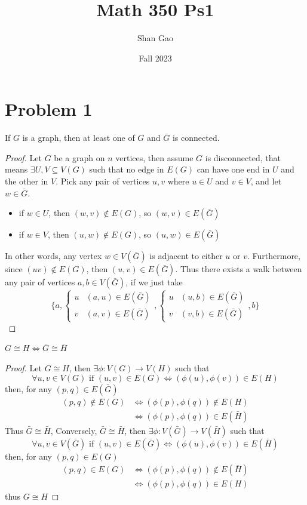 \documentclass[12pt]{article}
\title{Math 350 Ps1}
\author{Shan Gao}
\date{Fall 2023}
\begin{document}
\maketitle
\section{Problem 1}
\begin{lemma}\label{lem:1}
	If $G$ is a graph, then at least one of $G$ and $\bar{G}$ is connected.
\end{lemma}
\begin{proof}
	Let $G$ be a graph on $n$ vertices, then assume $G$ is disconnected, that means $\exists U,V \subseteq V(G)$ such that no edge in $E(G)$ can have one end in $U$ and the other in $V$. Pick any pair of vertices $u,v$ where $u \in U$ and $v \in V$, and let $w \in \bar{G}$. 
	\begin{itemize}
		\item if $w \in U$, then $(w,v) \notin E(G)$, so $(w,v) \in E(\bar{G})$
		\item if $w \in V$, then $(u,w) \notin E(G)$, so $(u,w) \in E(\bar{G})$
	\end{itemize}
	In other words, any vertex $w \in V(\bar{G})$ is adjacent to either $u$ or $v$. Furthermore, since $(uv) \notin E(G)$, then $(u,v) \in E(\bar{G})$. Thus there exists a walk between any pair of vertices $a,b \in V(\bar{G})$, if we just take 
	\begin{equation*}
		\{a , \begin{cases}
				u & (a,u) \in E(\bar{G})\\
				v & (a,v) \in E(\bar{G})
		\end{cases}, \begin{cases}
				u & (u,b) \in E(\bar{G})\\
				v & (v,b) \in E(\bar{G})
		\end{cases}, b\}
	\end{equation*}

\end{proof}
\begin{lemma} \label{lem:2}
	$G \cong H \iff \bar{G} \cong \bar{H}$
\end{lemma}
\begin{proof}
	Let $G \cong H$, then $\exists \phi \colon V(G) \to V(H)$ such that 
	\[ \forall u,v \in V(G) \text{ if }  (u,v) \in E(G) \iff (\phi(u), \phi(v)) \in E(H) \]
	then, for any $(p,q) \in E(\bar{G})$
	\begin{align*}
		(p,q) \notin E(G) &\iff (\phi(p), \phi(q)) \notin E(H)\\
				  &\iff (\phi(p), \phi(q)) \in E(\bar{H})
	\end{align*}
	Thus $\bar{G} \cong \bar{H}$,
	Conversely, $\bar{G} \cong \bar{H}$, then $\exists \phi \colon V(\bar{G}) \to V(\bar{H})$ such that
	\[ \forall u,v \in V(\bar{G}) \text{ if }  (u,v) \in E(\bar{G}) \iff (\phi(u), \phi(v)) \in E(\bar{H}) \]
	then, for any $(p,q) \in E(G)$
	\begin{align*}
		(p,q) \in E(G) &\iff (\phi(p), \phi(q)) \notin E(\bar{H})\\
				  &\iff (\phi(p), \phi(q)) \in E(H)
	\end{align*}
	thus $G \cong H$

\end{proof}
\end{document}
